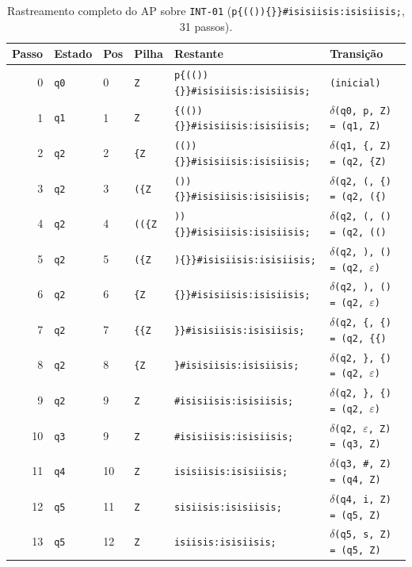 \begin{table}[t]
\centering
\caption{Rastreamento completo do AP sobre \texttt{INT-01} (\texttt{p\{(())\{\}\}\#isisiisis:isisiisis;}, 31 passos).}
\label{tab:trace_ap}
\scriptsize\setlength{\tabcolsep}{4pt}
\begin{tabularx}{\textwidth}{@{}rllllX@{}}
\toprule
Passo & Estado & Pos & Pilha & Restante & Transição \\
\midrule
0 & \texttt{q0} & 0 & \texttt{Z} & \texttt{p\{(())\{\}\}\#isisiisis:isisiisis;} & \texttt{(inicial)} \\
1 & \texttt{q1} & 1 & \texttt{Z} & \texttt{\{(())\{\}\}\#isisiisis:isisiisis;} & \texttt{$\delta$(q0, p, Z) = (q1, Z)} \\
2 & \texttt{q2} & 2 & \texttt{\{Z} & \texttt{(())\{\}\}\#isisiisis:isisiisis;} & \texttt{$\delta$(q1, \{, Z) = (q2, \{Z)} \\
3 & \texttt{q2} & 3 & \texttt{(\{Z} & \texttt{())\{\}\}\#isisiisis:isisiisis;} & \texttt{$\delta$(q2, (, \{) = (q2, (\{)} \\
4 & \texttt{q2} & 4 & \texttt{((\{Z} & \texttt{))\{\}\}\#isisiisis:isisiisis;} & \texttt{$\delta$(q2, (, () = (q2, (()} \\
5 & \texttt{q2} & 5 & \texttt{(\{Z} & \texttt{)\{\}\}\#isisiisis:isisiisis;} & \texttt{$\delta$(q2, ), () = (q2, $\varepsilon$)} \\
6 & \texttt{q2} & 6 & \texttt{\{Z} & \texttt{\{\}\}\#isisiisis:isisiisis;} & \texttt{$\delta$(q2, ), () = (q2, $\varepsilon$)} \\
7 & \texttt{q2} & 7 & \texttt{\{\{Z} & \texttt{\}\}\#isisiisis:isisiisis;} & \texttt{$\delta$(q2, \{, \{) = (q2, \{\{)} \\
8 & \texttt{q2} & 8 & \texttt{\{Z} & \texttt{\}\#isisiisis:isisiisis;} & \texttt{$\delta$(q2, \}, \{) = (q2, $\varepsilon$)} \\
9 & \texttt{q2} & 9 & \texttt{Z} & \texttt{\#isisiisis:isisiisis;} & \texttt{$\delta$(q2, \}, \{) = (q2, $\varepsilon$)} \\
10 & \texttt{q3} & 9 & \texttt{Z} & \texttt{\#isisiisis:isisiisis;} & \texttt{$\delta$(q2, $\varepsilon$, Z) = (q3, Z)} \\
11 & \texttt{q4} & 10 & \texttt{Z} & \texttt{isisiisis:isisiisis;} & \texttt{$\delta$(q3, \#, Z) = (q4, Z)} \\
12 & \texttt{q5} & 11 & \texttt{Z} & \texttt{sisiisis:isisiisis;} & \texttt{$\delta$(q4, i, Z) = (q5, Z)} \\
13 & \texttt{q5} & 12 & \texttt{Z} & \texttt{isiisis:isisiisis;} & \texttt{$\delta$(q5, s, Z) = (q5, Z)} \\

\end{tabularx}
\end{table}
